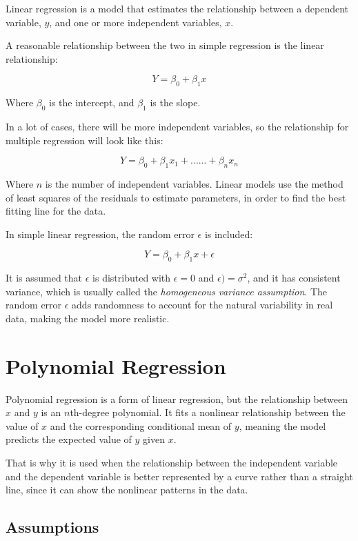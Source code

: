 
Linear regression is a model that estimates the relationship between a dependent variable, \( y \), and one or more independent variables, \( x \).

A reasonable relationship between the two in simple regression is the linear relationship:

\[
Y = \beta_0 + \beta_1 x
\]

Where \( \beta_0 \) is the intercept, and \( \beta_1 \) is the slope.

In a lot of cases, there will be more independent variables, so the relationship for multiple regression will look like this:

\[
Y = \beta_0 + \beta_1 x_1 + ......+ \beta_n x_n
\]



Where \( n \) is the number of independent variables. Linear models use the method of least squares of the residuals to estimate parameters, in order to find the best fitting line for the data.

In simple linear regression, the random error \( \epsilon \) is included:

\[
Y = \beta_0 + \beta_1 x + \epsilon
\]

It is assumed that \( \epsilon \) is distributed with $\epsilon = 0$ and $\epsilon) = \sigma^2$, and it has consistent variance, which is usually called the \textit{homogeneous variance assumption}. The random error \( \epsilon \) adds randomness to account for the natural variability in real data, making the model more realistic.

\section*{Polynomial Regression}

Polynomial regression is a form of linear regression, but the relationship between \( x \) and \( y \) is an \( n \)th-degree polynomial. It fits a nonlinear relationship between the value of \( x \) and the corresponding conditional mean of \( y \), meaning the model predicts the expected value of \( y \) given \( x \).

That is why it is used when the relationship between the independent variable and the dependent variable is better represented by a curve rather than a straight line, since it can show the nonlinear patterns in the data.

	\subsection{Assumptions}
	